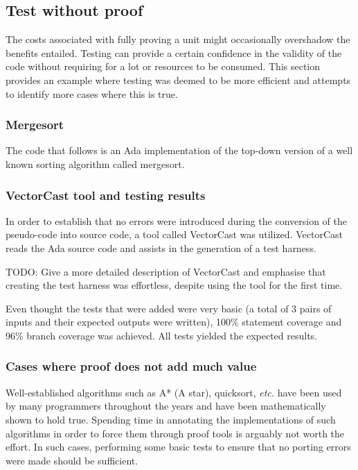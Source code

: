 \documentclass{llncs}
\newcommand{\vectorcast}{VectorCast\xspace}
\newcommand{\etc}{\textit{etc.}\xspace}
\begin{document}
\subsection{Test without proof}
The costs associated with fully proving a unit might occasionally
overshadow the benefits entailed. Testing can provide a certain
confidence in the validity of the code without requiring for a lot or
resources to be consumed. This section provides an example where
testing was deemed to be more efficient and attempts to identify more
cases where this is true.

\subsubsection{Mergesort}
The code that follows is an Ada implementation of the top-down version
of a well known sorting algorithm called mergesort.
 

\subsubsection{\vectorcast tool and testing results}
In order to establish that no errors were introduced during the
conversion of the pseudo-code into source code, a tool called
\vectorcast was utilized. \vectorcast reads the Ada source code and
assists in the generation of a test harness.

TODO: Give a more detailed description of \vectorcast and emphasise
that creating the test harness was effortless, despite using the tool
for the first time.

Even thought the tests that were added were very basic (a total of 3
pairs of inputs and their expected outputs were written), 100\%
statement coverage and 96\% branch coverage was achieved. All tests
yielded the expected results.

\subsubsection{Cases where proof does not add much value}
Well-established algorithms such as A* (A star), quicksort, \etc have
been used by many programmers throughout the years and have been
mathematically shown to hold true. Spending time in annotating the
implementations of such algorithms in order to force them through
proof tools is arguably not worth the effort. In such cases,
performing some basic tests to ensure that no porting errors were made
should be sufficient.
\end{document}
